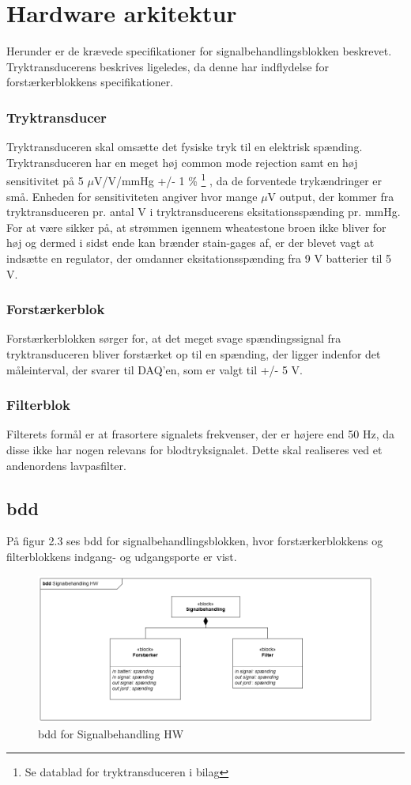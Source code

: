 \section{Hardware arkitektur}
Herunder er de krævede specifikationer for signalbehandlingsblokken beskrevet. Tryktransducerens beskrives ligeledes, da denne har indflydelse for forstærkerblokkens specifikationer. 

\subsubsection{Tryktransducer}
Tryktransduceren skal omsætte det fysiske tryk til en elektrisk spænding. Tryktransduceren har en meget høj common mode rejection samt en høj sensitivitet på 5 $\mu$V/V/mmHg +/- 1 \% \footnote{Se datablad for tryktransduceren i bilag} , da de forventede trykændringer er små. Enheden for sensitiviteten angiver hvor mange $\mu$V output, der kommer fra tryktransduceren pr. antal V i tryktransducerens eksitationsspænding pr. mmHg. For at være sikker på, at strømmen igennem wheatestone broen ikke bliver for høj og dermed i sidst ende kan brænder stain-gages af, er der blevet vagt at indsætte en regulator, der omdanner eksitationsspænding fra 9 V batterier til 5 V. 

\subsubsection{Forstærkerblok}
Forstærkerblokken sørger for, at det meget svage spændingssignal fra tryktransduceren bliver forstærket op til en spænding, der ligger indenfor det måleinterval, der svarer til DAQ'en, som er valgt til +/- 5 V.
 
\subsubsection{Filterblok}
Filterets formål er at frasortere signalets frekvenser, der er højere end 50 Hz, da disse ikke har nogen relevans for blodtryksignalet. Dette skal realiseres ved et andenordens lavpasfilter. 
 
\subsection{bdd}
På figur 2.3 ses bdd for signalbehandlingsblokken, hvor forstærkerblokkens og filterblokkens indgang- og udgangsporte er vist.  
\begin{figure}[H]
	\centering
	\includegraphics[width=1\textwidth]{Figurer/4}
	\caption{bdd for Signalbehandling HW}
	\label{fig:bddhw-diagram}
\end{figure}

